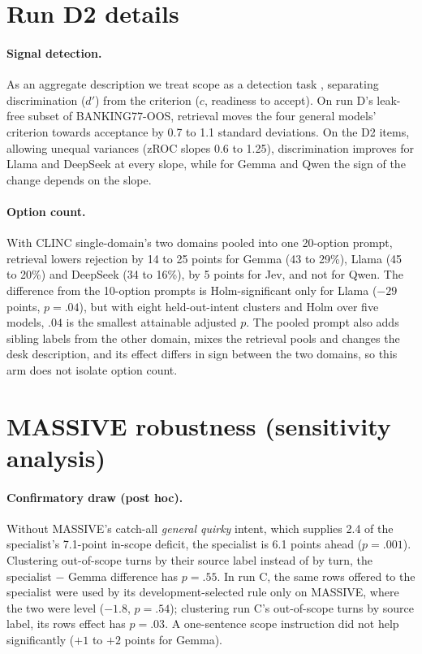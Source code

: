 \documentclass[11pt]{article}
\begin{document}
\section{Run D2 details}
\label{app:d2}

\paragraph{Signal detection.} As an aggregate description we treat scope as a detection task \citep{macmillan2005detection}, separating discrimination ($d'$) from the criterion ($c$, readiness to accept). On run D's leak-free subset of BANKING77-OOS, retrieval moves the four general models' criterion towards acceptance by 0.7 to 1.1 standard deviations. On the D2 items, allowing unequal variances (zROC slopes 0.6 to 1.25), discrimination improves for Llama and DeepSeek at every slope, while for Gemma and Qwen the sign of the change depends on the slope.

\paragraph{Option count.} With CLINC single-domain's two domains pooled into one 20-option prompt, retrieval lowers rejection by 14 to 25 points for Gemma (43 to 29\%), Llama (45 to 20\%) and DeepSeek (34 to 16\%), by 5 points for Jev, and not for Qwen. The difference from the 10-option prompts is Holm-significant only for Llama ($-29$ points, $p=.04$), but with eight held-out-intent clusters and Holm over five models, $.04$ is the smallest attainable adjusted $p$. The pooled prompt also adds sibling labels from the other domain, mixes the retrieval pools and changes the desk description, and its effect differs in sign between the two domains, so this arm does not isolate option count.

\section{MASSIVE robustness (sensitivity analysis)}
\label{app:massive}

\paragraph{Confirmatory draw (post hoc).} Without MASSIVE's catch-all \emph{general quirky} intent, which supplies 2.4 of the specialist's 7.1-point in-scope deficit, the specialist is 6.1 points ahead ($p=.001$). Clustering out-of-scope turns by their source label instead of by turn, the specialist $-$ Gemma difference has $p=.55$. In run C, the same rows offered to the specialist were used by its development-selected rule only on MASSIVE, where the two were level ($-1.8$, $p=.54$); clustering run C's out-of-scope turns by source label, its rows effect has $p=.03$. A one-sentence scope instruction did not help significantly ($+1$ to $+2$ points for Gemma).
\end{document}
